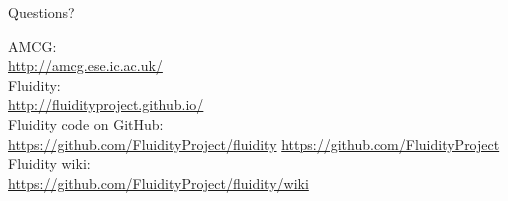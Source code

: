\documentclass[t]{beamer}
\begin{document}
\begin{frame}{Questions?}
\begin{center}
\vfill
AMCG:\\
\url{http://amcg.ese.ic.ac.uk/}\\[15pt]
Fluidity:\\
\url{http://fluidityproject.github.io/}\\[15pt]
Fluidity code on GitHub:\\
\url{https://github.com/FluidityProject/fluidity}
\url{https://github.com/FluidityProject}\\[15pt]
Fluidity wiki:\\
\url{https://github.com/FluidityProject/fluidity/wiki}
\end{center}
\end{frame}
\end{document}
